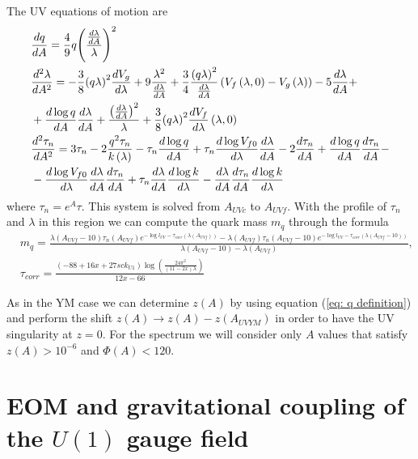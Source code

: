 \documentclass[a4paper,12pt]{article}
\begin{document}
The UV equations of motion are
\begin{align}
&\frac{dq}{dA} =  \frac{4}{9} q {\left(\frac{\frac{d\lambda}{dA}}{\lambda}\right)}^2 \\
&\frac{d^2\lambda}{dA^2} = -\frac{3}{8}  {\left(q \lambda \right)}^2 \frac{d V_g}{d\lambda} + 9 \frac{\lambda^2}{\frac{d\lambda}{dA}} + \frac{3}{4} \frac{{\left(q \lambda \right)}^2}{\frac{d\lambda}{dA}} \left( V_f\left(\lambda, 0\right) - V_g \left(\lambda\right) \right) - 5 \frac{d\lambda}{dA}  + \\
& + \frac{d \log q}{dA} \frac{d\lambda}{d A} + \frac{{\left( \frac{d\lambda}{dA}\right)}^2}{\lambda} + \frac{3}{8} {\left( q \lambda \right)}^2 \frac{d V_f}{d\lambda} \left(\lambda, 0 \right) \\ \notag
& \frac{d^2 \tau_n}{dA^2} = 3 \tau_n - 2 \frac{q^2 \tau_n}{k\left(\lambda\right)} - \tau_n \frac{d \log q}{dA} + \tau_n \frac{d \log V_{f0}}{d\lambda} \frac{d\lambda}{dA} - 2 \frac{d\tau_n}{d A} + \frac{d\log q}{d A} \frac{d \tau_n}{dA} - \\
& - \frac{d \log V_{f0}}{d\lambda} \frac{d\lambda}{dA} \frac{d\tau_n}{dA} + \tau_n \frac{d\lambda}{dA} \frac{d \log k}{d\lambda} - \frac{d\lambda}{dA} \frac{d\tau_n}{dA} \frac{d \log k}{d\lambda}
\end{align}
where $\tau_n = e^A \tau$. This system is solved from $A_{UVc}$ to $A_{UVf}$. With the profile of $\tau_n$ and $\lambda$ in this region we can compute the quark mass $m_q$ through the formula
\begin{align}
&m_q = \frac{\lambda \left(A_{UVf} - 10\right) \tau_n\left(A_{UVf}\right)e^{- \log l_{UV} - \tau_{corr}\left(\lambda\left(A_{UVf}\right)\right)} - \lambda \left(A_{UVf} \right) \tau_n\left(A_{UVf} - 10\right)e^{- \log l_{UV} - \tau_{corr}\left(\lambda\left(A_{UVf} - 10\right)\right)} }{\lambda\left(A_{UVf} - 10\right) - \lambda\left(A_{UVf}\right)}, \\
& \tau_{corr} = \frac{\left(-88 + 16 x + 27 sc k_{U1}\right) \log\left( \frac{24 \pi^2}{\left(11 - 2 x\right) \lambda}\right)}{12 x - 66}
\end{align}

As in the YM case we can determine $z\left(A\right)$ by using equation (\ref{eq: q definition}) and perform the shift $z\left(A\right) \to z\left(A\right) - z\left(A_{UVYM} \right) $ in order to have the UV singularity at $z = 0$. For the spectrum we will consider only  $A$ values that satisfy $z\left(A\right) > 10^{-6}$ and $\Phi\left(A\right) < 120$.


\section{EOM and gravitational coupling of the $U(1)$ gauge field}
\label{appendix:b}
\end{document}
